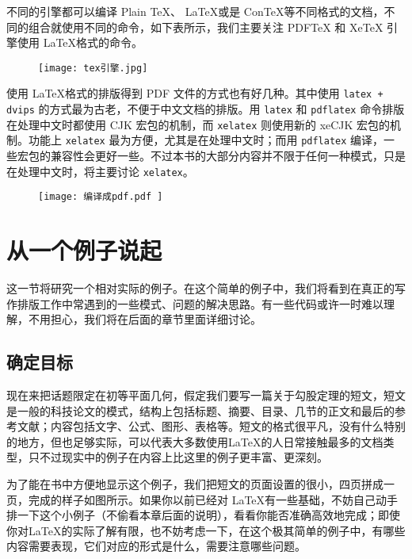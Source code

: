 {    \qquad 不同的引擎都可以编译 Plain \TeX 、 \LaTeX 或是 Con\TeX 等不同格式的文档，不同的组合就使用不同的命令，如下表所示，我们主要关注 PDFTeX 和 XeTeX 引擎使用 \LaTeX 格式的命令。

    \begin{figure}[H]
        \centering
        \texttt{[image: tex引擎.jpg]}
    \end{figure}

    \qquad 使用 \LaTeX 格式的排版得到 PDF 文件的方式也有好几种。其中使用 \lstinline{latex + dvips} 的方式最为古老，不便于中文文档的排版。用 \lstinline{latex} 和 \lstinline{pdflatex} 命令排版在处理中文时都使用 CJK 宏包的机制，而 \lstinline{xelatex} 则使用新的 xeCJK 宏包的机制。功能上 \lstinline{xelatex} 最为方便，尤其是在处理中文时；而用 \lstinline{pdflatex} 编译，一些宏包的兼容性会更好一些。不过本书的大部分内容并不限于任何一种模式，只是在处理中文时，将主要讨论 \lstinline{xelatex}。

    \begin{figure}[H]
        \centering
        \texttt{[image: 编译成pdf.pdf ]}
    \end{figure}
}

\section{从一个例子说起}

这一节将研究一个相对实际的例子。在这个简单的例子中，我们将看到在真正的写作排版工作中常遇到的一些模式、问题的解决思路。有一些代码或许一时难以理解，不用担心，我们将在后面的章节里面详细讨论。

\subsection{确定目标}

现在来把话题限定在初等平面几何，假定我们要写一篇关于勾股定理的短文，短文是一般的科技论文的模式，结构上包括标题、摘要、目录、几节的正文和最后的参考文献；内容包括文字、公式、图形、表格等。短文的格式很平凡，没有什么特别的地方，但也足够实际，可以代表大多数使用\LaTeX 的人日常接触最多的文档类型，只不过现实中的例子在内容上比这里的例子更丰富、更深刻。

为了能在书中方便地显示这个例子，我们把短文的页面设置的很小，四页拼成一页，完成的样子如图所示。如果你以前已经对 \LaTeX 有一些基础，不妨自己动手排一下这个小例子（不偷看本章后面的说明），看看你能否准确高效地完成；即使你对\LaTeX 的实际了解有限，也不妨考虑一下，在这个极其简单的例子中，有哪些内容需要表现，它们对应的形式是什么，需要注意哪些问题。

